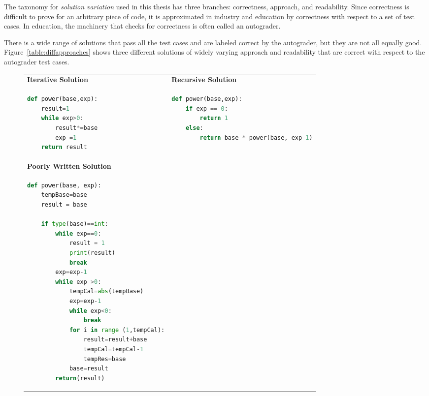 The taxonomy for {\it solution variation} used in this thesis has three branches: correctness, approach, and readability. Since correctness is difficult to prove for an arbitrary piece of code, it is approximated in industry and education by correctness with respect to a set of test cases. In education, the machinery that checks for correctness is often called an autograder.

There is a wide range of solutions that pass all the test cases and are labeled correct by the autograder, but they are not all equally good. Figure~\ref{table:diffapproaches} shows three different solutions of widely varying approach and readability that are correct with respect to the autograder test cases.

\begin{figure}
\begin{tabular}{ll}
{\bf Iterative Solution} & {\bf Recursive Solution} \\
\begin{minipage}{0.5\linewidth}
\begin{lstlisting}[basicstyle=\linespread{1.0}\ttfamily\footnotesize,language=python]
def power(base,exp):
    result=1
    while exp>0:
        result*=base
        exp-=1
    return result
\end{lstlisting}
\end{minipage}
&
\begin{minipage}{0.5\linewidth}
\begin{lstlisting}[basicstyle=\linespread{1.0}\ttfamily\footnotesize,language=python]
def power(base,exp):
    if exp == 0:
        return 1
    else:
        return base * power(base, exp-1)
\end{lstlisting}
\end{minipage} \\

{\bf Poorly Written Solution} & \\
\begin{minipage}{0.5\linewidth}
\begin{lstlisting}[basicstyle=\linespread{1.0}\ttfamily\footnotesize,language=python]
def power(base, exp):
    tempBase=base
    result = base

    if type(base)==int:
        while exp==0:
            result = 1
            print(result)
            break
        exp=exp-1
        while exp >0:
            tempCal=abs(tempBase)
            exp=exp-1
            while exp<0:
                break
            for i in range (1,tempCal):
                result=result+base
                tempCal=tempCal-1
                tempRes=base
            base=result
        return(result)


\end{lstlisting}
\end{minipage}
\end{tabular}
\end{figure}
